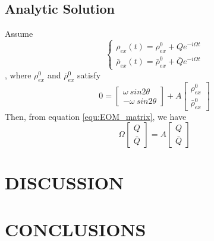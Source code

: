 \documentclass[aps,prd,twocolumn,amsmath,amssymb,groupedaddress]{revtex4-2}
\begin{document}
\subsection{\label{subsec:analytic} Analytic Solution}
Assume
\begin{equation}
	\begin{cases}
		\rho_{ex}(t) = \rho^0_{ex} + Q e^{-i\Omega t}
		\\
		\bar{\rho}_{ex}(t) = \bar{\rho}^0_{ex} + \bar{Q} e^{-i\Omega t}
	\end{cases}
\end{equation}
, where $\rho^0_{ex}$ and $\bar{\rho}^0_{ex}$ satisfy
\begin{equation}
	0= \begin{bmatrix}
		\omega ~sin2\theta \\ - \omega ~sin2\theta
	\end{bmatrix}  + 
	A \begin{bmatrix} \rho^0_{ex} \\ \bar{\rho}^0_{ex}
	\end{bmatrix}
\end{equation}
Then, from equation \ref{equ:EOM_matrix}, we have
\begin{equation}
	\Omega 
	\begin{bmatrix}
		Q \\ \bar{Q}
	\end{bmatrix}
	= A
	\begin{bmatrix}
		Q \\ \bar{Q}
	\end{bmatrix}
\end{equation}

\section{\label{sec:disscussion} DISCUSSION}

\section{\label{sec:conclusion} CONCLUSIONS}


%
\end{document}
